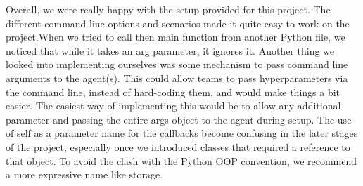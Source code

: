 \documentclass{article}
\begin{document}
Overall, we were really happy with the setup provided for this project. The different command line options and scenarios made it quite easy to work on the project.When we tried to call then main function from another Python file, we noticed that while it takes an arg parameter, it ignores it. Another thing we looked into implementing ourselves was some mechanism to pass command line arguments to the agent(s). This could allow teams to pass hyperparameters via the command line, instead of hard-coding them, and would make things a bit easier. The easiest way of implementing this would be to allow any additional parameter and passing the entire args object to the agent during setup. 
The use of self as a parameter name for the callbacks become confusing in the later stages of the project, especially once we introduced classes that required a reference to that object. To avoid the clash with the Python OOP convention, we recommend a more expressive name like storage.
\end{document}
